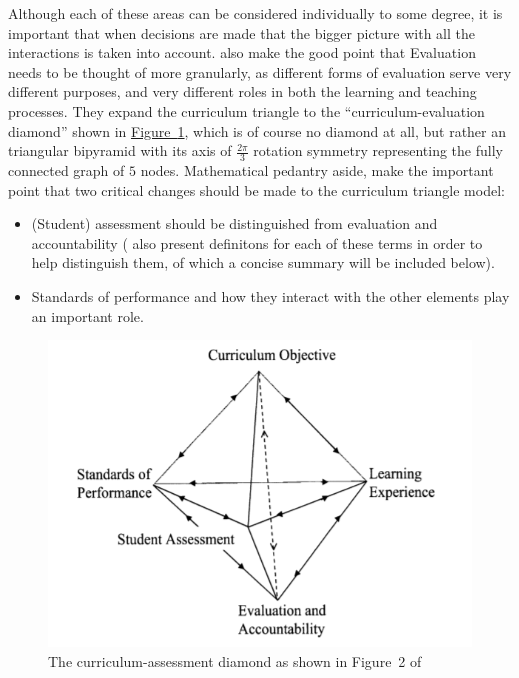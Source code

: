 \documentclass[twoside,12pt,a4paper]{report}
\newcommand{\reffig}[1]{\hyperref[fig:#1]{Figure~\ref{fig:#1}}}
\begin{document}
Although each of these areas can be considered individually to some degree, it is important that when decisions are made that the bigger picture with all the interactions is taken into account.  also make the good point that Evaluation needs to be thought of more granularly, as different forms of evaluation serve very different purposes, and very different roles in both the learning and teaching processes. They expand the curriculum triangle to the ``curriculum-evaluation diamond'' shown in \reffig{diamond}, which is of course no diamond at all, but rather an triangular bipyramid with its axis of $\frac{2\pi}{3}$ rotation symmetry representing the fully connected graph of $5$ nodes. Mathematical pedantry aside,  make the important point that two critical changes should be made to the curriculum triangle model:
\begin{itemize}
	\item (Student) assessment should be distinguished from evaluation and accountability ( also present definitons for each of these terms in order to help distinguish them, of which a concise summary will be included below).
	\item Standards of performance and how they interact with the other elements play an important role.
\end{itemize}

\begin{figure}[ht]
\centering
\includegraphics{./figures/curriculum-assessment-model.PNG}
\caption{The curriculum-assessment diamond as shown in Figure~2 of \protect{} \label{fig:diamond}}
\end{figure}
\end{document}
